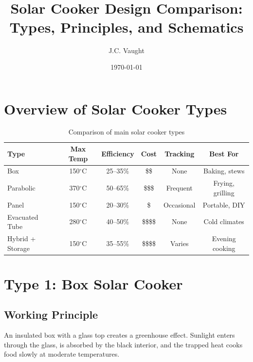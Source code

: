 \documentclass[11pt]{article}
\title{\textbf{Solar Cooker Design Comparison:\\Types, Principles, and Schematics}}
\author{J.C. Vaught}
\date{\today}
\newcommand{\degC}{$^\circ$C}
\begin{document}
\maketitle

\section{Overview of Solar Cooker Types}

\begin{table}[H]
\centering
\caption{Comparison of main solar cooker types}
\small
\begin{tabular}{lccccc}
\toprule
\textbf{Type} & \textbf{Max Temp} & \textbf{Efficiency} & \textbf{Cost} & \textbf{Tracking} & \textbf{Best For} \\
\midrule
Box & 150\degC & 25--35\% & \$\$ & None & Baking, stews \\
Parabolic & 370\degC & 50--65\% & \$\$\$ & Frequent & Frying, grilling \\
Panel & 150\degC & 20--30\% & \$ & Occasional & Portable, DIY \\
Evacuated Tube & 280\degC & 40--50\% & \$\$\$\$ & None & Cold climates \\
Hybrid + Storage & 150\degC & 35--55\% & \$\$\$\$ & Varies & Evening cooking \\
\bottomrule
\end{tabular}
\end{table}

\section{Type 1: Box Solar Cooker}

\subsection{Working Principle}
An insulated box with a glass top creates a greenhouse effect. Sunlight enters through the glass, is absorbed by the black interior, and the trapped heat cooks food slowly at moderate temperatures.
\end{document}
